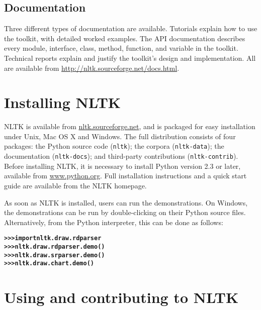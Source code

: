 \documentclass[11pt]{article}
\begin{document}
\subsection{Documentation}

Three different types of documentation are available.  Tutorials
explain how to use the toolkit, with detailed worked examples.  The
API documentation describes every module, interface, class, method,
function, and variable in the toolkit.  Technical reports explain and
justify the toolkit's design and implementation.  All are available
from \url{http://nltk.sourceforge.net/docs.html}.

\section{Installing NLTK}

NLTK is available from \url{nltk.sourceforge.net}, and is packaged for
easy installation under Unix, Mac OS X and Windows.  The full
distribution consists of four packages: the Python source code
(\texttt{nltk}); the corpora (\texttt{nltk-data}); the documentation
(\texttt{nltk-docs}); and third-party contributions
(\texttt{nltk-contrib}).  Before installing NLTK, it is necessary to
install Python version 2.3 or later, available from
\url{www.python.org}.  Full installation instructions and a quick
start guide are available from the NLTK homepage.

As soon as NLTK is installed, users can run the demonstrations.  On
Windows, the demonstrations can be run by double-clicking on their
Python source files.  Alternatively, from the Python interpreter, this
can be done as follows:

\begin{alltt}
\textbf{>>> import nltk.draw.rdparser}
\textbf{>>> nltk.draw.rdparser.demo()}
\textbf{>>> nltk.draw.srparser.demo()}
\textbf{>>> nltk.draw.chart.demo()}
\end{alltt}

\section{Using and contributing to NLTK}
\end{document}
